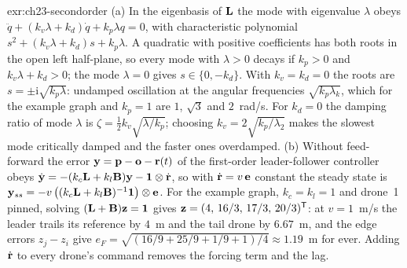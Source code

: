 \begin{solution}{exr:ch23-secondorder}
(a) In the eigenbasis of $\mathbf{L}$ the mode with eigenvalue $\lambda$ obeys $\ddot q+(k_v\lambda+k_d)\dot q+k_p\lambda q=0$, with characteristic polynomial $s^2+(k_v\lambda+k_d)s+k_p\lambda$. A quadratic with positive coefficients has both roots in the open left half-plane, so every mode with $\lambda>0$ decays if $k_p>0$ and $k_v\lambda+k_d>0$; the mode $\lambda=0$ gives $s\in\{0,-k_d\}$. With $k_v=k_d=0$ the roots are $s=\pm\mathrm{i}\sqrt{k_p\lambda}$: undamped oscillation at the angular frequencies $\sqrt{k_p\lambda_k}$, which for the example graph and $k_p=1$ are $1$, $\sqrt3$ and $2$~rad/s. For $k_d=0$ the damping ratio of mode $\lambda$ is $\zeta=\tfrac12 k_v\sqrt{\lambda/k_p}$; choosing $k_v=2\sqrt{k_p/\lambda_2}$ makes the slowest mode critically damped and the faster ones overdamped. (b) Without feed-forward the error $\mathbf{y}=\mathbf{p}-\mathbf{o}-\mathbf{r}(t)$ of the first-order leader-follower controller obeys $\dot{\mathbf{y}}=-(k_c\mathbf{L}+k_l\mathbf{B})\mathbf{y}-\mathbf{1}\otimes\dot{\mathbf{r}}$, so with $\dot{\mathbf{r}}=v\,\mathbf{e}$ constant the steady state is $\mathbf{y}_{ss}=-v\,\bigl((k_c\mathbf{L}+k_l\mathbf{B})^{-1}\mathbf{1}\bigr)\otimes\mathbf{e}$. For the example graph, $k_c=k_l=1$ and drone~1 pinned, solving $(\mathbf{L}+\mathbf{B})\mathbf{z}=\mathbf{1}$ gives $\mathbf{z}=(4,\,16/3,\,17/3,\,20/3)^{\mathsf{T}}$: at $v=1$~m/s the leader trails its reference by $4$~m and the tail drone by $6.67$~m, and the edge errors $z_j-z_i$ give $e_F=\sqrt{(16/9+25/9+1/9+1)/4}\approx1.19$~m for ever. Adding $\dot{\mathbf{r}}$ to every drone's command removes the forcing term and the lag.
\end{solution}

